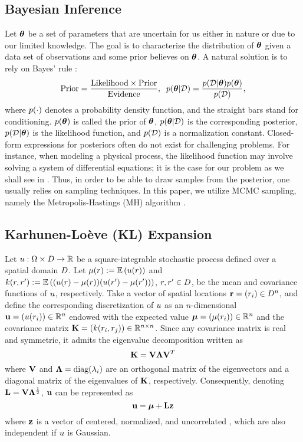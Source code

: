 \subsection{Bayesian Inference} 
Let ${\boldsymbol\theta}$ be a set of parameters that are uncertain for us either in nature or due to our limited knowledge. The goal is to characterize the distribution of ${\boldsymbol\theta}$ given a data set of observations and some prior believes on ${\boldsymbol\theta}$. A natural solution is to rely on Bayes' rule \cite{gelman2004}:
\begin{equation} \elabel{bayes}
  \text{Prior} = \frac{\text{Likelihood} \times \text{Prior}}{\text{Evidence}}, \;\; \f{\vparam | \Data} = \frac{\f{\Data | \vparam} \f{\vparam}}{\f{\Data}},
\end{equation}
where $\f{\cdot}$ denotes a probability density function, and the straight bars stand for conditioning. $\f{\vparam}$ is called the prior of ${\boldsymbol\theta}$, $\f{\vparam | \Data}$ is the corresponding posterior, $\f{\Data | \vparam}$ is the likelihood function, and $\f{\Data}$ is a normalization constant. Closed-form expressions for posteriors often do not exist for challenging problems. For instance, when modeling a physical process, the likelihood function may involve solving a system of differential equations; it is the case for our problem as we shall see in . Thus, in order to be able to draw samples from the posterior, one usually relies on sampling techniques. In this paper, we utilize MCMC sampling, namely the Metropolis-Hastings (MH) algorithm \cite{gelman2004}.

\subsection{Karhunen-Lo\`{e}ve (KL) Expansion} 
Let $u: \Omega \times D \to \mathbb{R}$ be a square-integrable stochastic process defined over a spatial domain $D$. Let $\fMean{\r} := \E{\u(\r)}$ and $\fCov{\r, \r'} := \E{(\u(\r) - \fMean{\r}) (\u(\r') - \fMean{\r'})}$, $r, r' \in D$, be the mean and covariance functions of $u$, respectively. Take a vector of spatial locations $\mathbf{r} = (r_i) \in D^n$, and define the corresponding discretization of $u$ as an $n$-dimensional \rv\ $\mathbf{u} = (u(r_i)) \in \mathbb{R}^n$ endowed with the expected value $\vMean = (\fMean{\r_i}) \in \real^n$ and the covariance matrix $\mCov = (\fCov{\r_i, \r_j}) \in \real^{n \times n}$. Since any covariance matrix is real and symmetric, it admits the eigenvalue decomposition \cite{press2007} written as
\[
  \mathbf{K} = \mathbf{V} \mathbf{\Lambda} \mathbf{V}^T
\]
where $\mathbf{V}$ and $\mathbf{\Lambda} = \text{diag}(\lambda_i)$ are an orthogonal matrix of the eigenvectors and a diagonal matrix of the eigenvalues of $\mathbf{K}$, respectively. Consequently, denoting $\mathbf{L} = \mathbf{V} \mathbf{\Lambda}^\frac{1}{2}$, $\mathbf{u}$ can be represented as
\begin{equation} \elabel{kl-expansion}
  \vu = \vMean + \mKL \vz
\end{equation}
where $\mathbf{z}$ is a vector of centered, normalized, and uncorrelated \rvs, which are also independent if $u$ is Gaussian.

